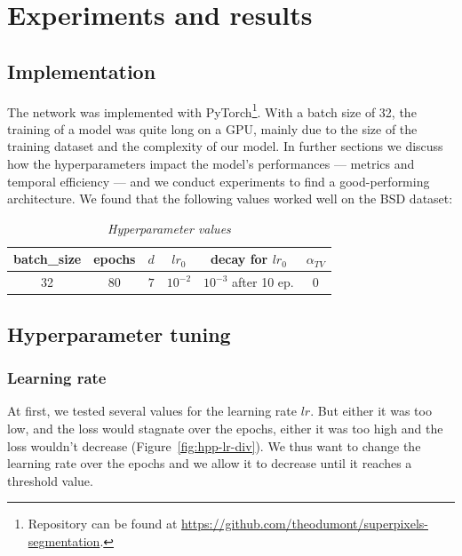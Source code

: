 \documentclass{article}
\begin{document}
\section{Experiments and results}
    \subsection{Implementation}
        The network was implemented with PyTorch\footnote{Repository can be found at \url{https://github.com/theodumont/superpixels-segmentation}.}. With a batch size of 32, the training of a model was quite long on a GPU, mainly due to the size of the training dataset and the complexity of our model. In further sections we discuss how the hyperparameters impact the model's performances --- metrics and temporal efficiency --- and we conduct experiments to find a good-performing architecture. We found that the following values worked well on the BSD dataset:
        \begin{table}[!ht]
            \centering
            \begin{tabular}{|c|c|c|c|c|c|}
                \hline
                batch\_size & epochs & $d$ & $lr_0$ & decay for $lr_0$ & $\alpha_{TV}$ \\
                \hline
                \hline
                32 & 80 & $7$ & $10^{-2}$ & $10^{-3}$ after 10 ep. & 0 \\
                \hline
            \end{tabular}
            \caption{\textit{Hyperparameter values}}
        \end{table}


    \subsection{Hyperparameter tuning}
        \subsubsection{Learning rate}
            At first, we tested several values for the learning rate $lr$. But either it was too low, and the loss would stagnate over the epochs, either it was too high and the loss wouldn't decrease (Figure~\ref{fig:hpp-lr-div}). We thus want to change the learning rate over the epochs and we allow it to decrease until it reaches a threshold value.
\end{document}
